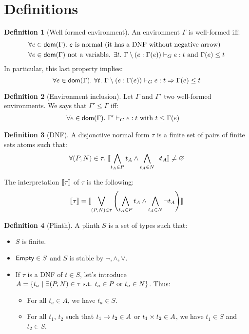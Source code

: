 \documentclass[a4paper]{article}
\theoremstyle{definition}
\newtheorem{definition}{Definition}
\begin{document}
    \section{Definitions}
      
    \begin{definition}[Well formed environment]
      An environment $\Gamma$ is well-formed iff:
      \begin{align*}
        &\forall e \in \textsf{dom}(\Gamma).\ e \text{ is normal (it has a DNF without negative arrow)}\\
        &\forall e \in \textsf{dom}(\Gamma) \text{ not a variable. } \exists t.\ \Gamma\setminus(e:\Gamma(e)) \vdash_G e : t \text{ and } \Gamma(e) \leq t
      \end{align*}
      In particular, this last property implies:
      \[
        \forall e \in \dom \Gamma.\ \forall t.\ \Gamma\setminus(e:\Gamma(e)) \tvdash e : t \Rightarrow \Gamma(e) \leq t
      \]
    \end{definition}
  
    \begin{definition}[Environment inclusion]
      Let $\Gamma$ and $\Gamma'$ two well-formed environments. We says that $\Gamma' \leq \Gamma$ iff:
      \begin{align*}
        &\forall e \in \textsf{dom}(\Gamma).\ \Gamma' \vdash_G e : t \text{ with } t \leq \Gamma(e)
      \end{align*}
    \end{definition}

    \begin{definition}[DNF]
      A disjonctive normal form $\tau$ is a finite set of pairs of finite sets atoms such that:
      \[ \forall (P,N)\in \tau.\ {\llbracket \bigwedge_{t_A \in P} t_A \land \bigwedge_{t_A \in N} \neg t_A \rrbracket} \neq \varnothing \]

      The interpretation ${\llbracket \tau \rrbracket}$ of $\tau$ is the following:
      \[
        {\llbracket \tau \rrbracket} = {\llbracket \bigvee_{(P,N)\in \tau} \left(\bigwedge_{t_A \in P} t_A \land \bigwedge_{t_A \in N} \neg t_A \right) \rrbracket}
      \]
    \end{definition}
    
    \begin{definition}[Plinth]
      A plinth $S$ is a set of types such that:
      \begin{itemize}
        \item $S$ is finite.
        \item $\textsf{Empty} \in S$ and $S$ is stable by $\neg, \land, \vee$. 
        \item If $\tau$ is a DNF of $t\in S$, let's introduce $A=\{t_a ~|~ \exists (P,N) \in \tau \text{ s.t. } t_a \in P \text{ or } t_a \in N \}$. Thus:
        \begin{itemize}
          \item For all $t_a \in A$, we have $t_a \in S$.
          \item For all $t_1$, $t_2$ such that $t_1\to t_2 \in A$ or $t_1\times t_2 \in A$,
          we have $t_1 \in S$ and $t_2 \in S$.
        \end{itemize}
      \end{itemize}
    \end{definition}
\end{document}
